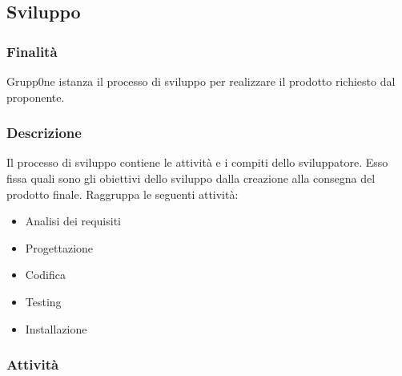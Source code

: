 \documentclass[../norme-di-progetto.tex]{subfiles}
\begin{document}
\subsection{Sviluppo}
\label{sub:sviluppo}
\subsubsection{Finalità}
\label{subs:finalita}
Grupp0ne istanza il processo di sviluppo per realizzare il prodotto richiesto dal proponente.
\subsubsection{Descrizione}
\label{subs:descrizione}
Il processo di sviluppo contiene le attività e i compiti dello sviluppatore. Esso fissa quali sono gli obiettivi dello sviluppo dalla creazione alla consegna del prodotto finale. Raggruppa le seguenti attività:
\begin{itemize}
	\item Analisi dei requisiti
	\item Progettazione
	\item Codifica
	\item Testing
	\item Installazione
\end{itemize}
\subsubsection{Attività}
\label{subs:attivita}
\end{document}
